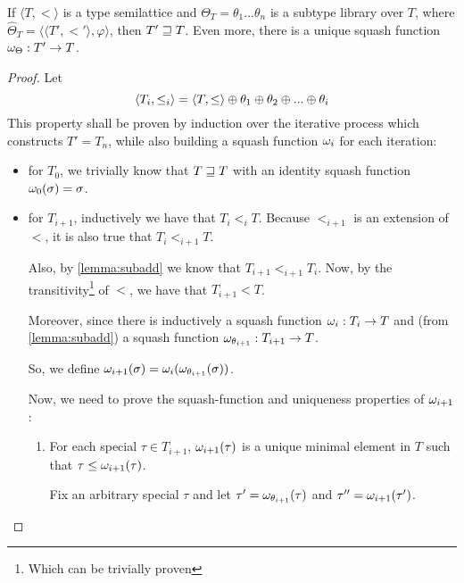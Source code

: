 \documentclass[main.tex]{subfiles}
\begin{document}
\begin{prop}
    If $\langle T, \less \rangle$ is a type semilattice and
    $\Theta_T = \theta_1 ... \theta_n$ is a subtype library over $T$, where
    $\hat{\Theta}_T = \langle \langle T', \less' \rangle, \varphi \rangle$,
    then $T' \sqsupseteq T$. Even more, there is a unique squash function
    $\omega_{\Theta} : T' \rightarrow T$.
\end{prop}
\begin{proof}
    Let \[
        \langle T_i, \leq_i \rangle = \langle T, \leq \rangle
        \oplus \theta_1 \oplus \theta_2 \oplus ... \oplus \theta_i
    \]
    This property shall be proven by induction over the iterative process
    which constructs $T' = T_n$, while also building a squash function
    $\omega_i$ for each iteration:
    \begin{itemize}
        \item for $T_0$, we trivially know that $T \sqsupseteq T$ with an identity
            squash function $\omega_0(\sigma) = \sigma$.
        \item for $T_{i + 1}$, inductively we have that $T_i \less_i T$.
            Because $\less_{i + 1}$ is an extension of $\less$, it is also true
            that $T_i \less_{i + 1} T$.

            Also, by \cref{lemma:subadd} we know that $T_{i + 1} \less_{i + 1} T_i$.
            Now, by the transitivity\footnote{Which can be trivially
            proven} of $\less$, we have that $T_{i + 1} \less T$.

            Moreover, since there is inductively a squash function
            $\omega_i : T_i \rightarrow T$ and (from \cref{lemma:subadd})
            a squash function $\omega_{\theta_{i + 1}} : T_{i + 1} \rightarrow T$.

            So, we define
            $\omega_{i + 1}(\sigma) = \omega_i(\omega_{\theta_{i + 1}}(\sigma))$.

            Now, we need to prove the squash-function and uniqueness
            properties of $\omega_{i + 1}$:
            \begin{enumerate}
                \item For each special
                    $\tau \in T_{i + 1}$, $\omega_{i + 1}(\tau)$ is a unique
                    minimal element in $T$ such that $\tau \leq \omega_{i + 1}(\tau)$.

                    Fix an arbitrary special $\tau$ and let
                    $\tau' = \omega_{\theta_{i + 1}}(\tau)$ and
                    $\tau'' = \omega_{i + 1}(\tau')$.


\end{enumerate}
\end{itemize}
\end{proof}
\end{document}
